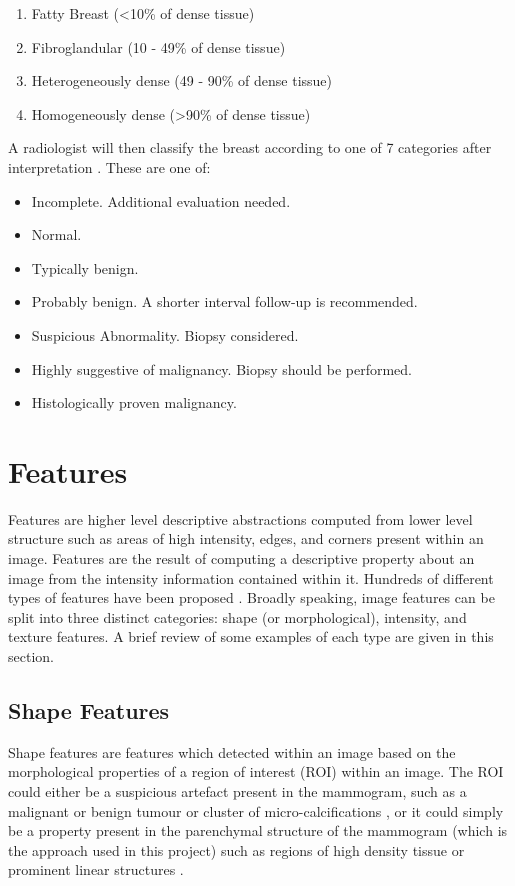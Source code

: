 \begin{enumerate}
	\item Fatty Breast (\textless10\% of dense tissue)
	\item Fibroglandular (10 - 49\% of dense tissue)
	\item Heterogeneously dense (49 - 90\% of dense tissue)
	\item Homogeneously dense (\textgreater 90\% of dense tissue)
\end{enumerate}

A radiologist will then classify the breast according to one of 7 categories after interpretation \cite{balleyguier2007birads}. These are one of:

\begin{itemize}
	\item Incomplete. Additional evaluation needed.
	\item Normal. 
	\item Typically benign.
	\item Probably benign. A shorter interval follow-up is recommended.
	\item Suspicious Abnormality. Biopsy considered.
	\item Highly suggestive of malignancy. Biopsy should be performed.
	\item Histologically proven malignancy.
\end{itemize}

\section{Features}
\label{sec:features}
Features are higher level descriptive abstractions computed from lower level structure such as areas of high intensity, edges, and corners present within an image. Features are the result of computing a descriptive property about an image from the intensity information contained within it. Hundreds of different types of features have been proposed \cite{cheng2006approaches, ganesan2013computer}. Broadly speaking, image features can be split into three distinct categories: shape (or morphological), intensity, and texture features. A brief review of some examples of each type are given in this section.

\subsection{Shape Features}
Shape features are features which detected within an image based on the morphological properties of a region of interest (ROI) within an image. The ROI could either be a suspicious artefact present in the mammogram, such as a malignant or benign tumour or cluster of micro-calcifications \cite{cheng2006approaches}, or it could simply be a property present in the parenchymal structure of the mammogram (which is the approach used in this project) such as regions of high density tissue \cite{chen2013multiscale} or prominent linear structures \cite{zwiggelaar1996finding}.

